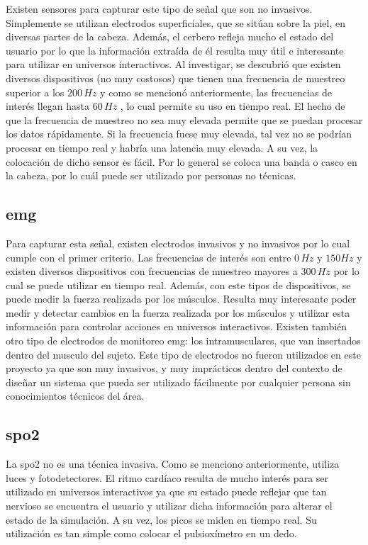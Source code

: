 Existen sensores para capturar este tipo de señal que son no invasivos. Simplemente se utilizan electrodos superficiales, que se sitúan sobre la piel, en diversas partes de la cabeza. Además, el cerbero refleja mucho el estado del usuario por lo que la información extraída de él resulta muy útil e interesante para utilizar en universos interactivos. Al investigar, se descubrió que existen diversos dispositivos (no muy costosos) que tienen una frecuencia de muestreo superior a los $200 \, Hz$ y como se mencionó anteriormente, las frecuencias de interés llegan hasta $60 \, Hz$ , lo cual  permite su uso en tiempo real. El hecho de que la frecuencia de muestreo no sea muy elevada permite que se puedan procesar los datos rápidamente. Si la frecuencia fuese muy elevada, tal vez no se podrían procesar en tiempo real y habría una latencia muy elevada. A su vez, la colocación de dicho sensor es fácil. Por lo general se coloca una banda o casco en la cabeza, por lo cuál puede ser utilizado por personas no técnicas.

\subsection{\acrshort{emg}}

Para capturar esta señal, existen electrodos invasivos y no invasivos por lo cual cumple con el primer criterio. Las frecuencias de interés son entre $0 \, Hz $ y $150 Hz$ y existen diversos dispositivos con frecuencias de muestreo mayores a $300 \, Hz$ por lo cual se puede utilizar en tiempo real. Además, con este tipos de dispositivos, se puede medir la fuerza realizada por los músculos. Resulta muy interesante poder medir y detectar cambios en la fuerza realizada por los músculos y utilizar esta información para controlar acciones en universos interactivos. Existen también otro tipo de electrodos de monitoreo \acrshort{emg}: los intramusculares, que van insertados dentro del musculo del sujeto. Este tipo de electrodos no fueron utilizados en este proyecto ya que son muy invasivos, y muy imprácticos dentro del contexto de diseñar un sistema que pueda ser utilizado fácilmente por cualquier persona sin conocimientos técnicos del área.

\subsection{\acrshort{spo2}}

La \gls{spo2} no es una técnica invasiva. Como se menciono anteriormente, utiliza luces y fotodetectores. El ritmo cardíaco resulta de mucho interés para ser utilizado en universos interactivos ya que su estado puede reflejar que tan nervioso se encuentra el usuario y utilizar dicha información para alterar el estado de la simulación. A su vez, los picos se miden en tiempo real. Su utilización es tan simple como colocar el pulsioxímetro en un dedo.

